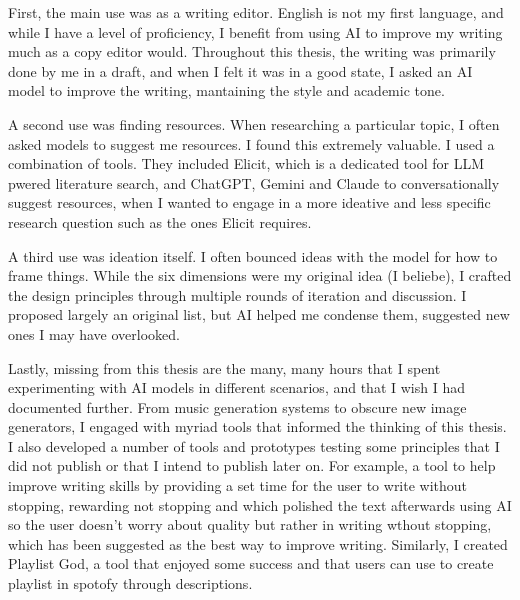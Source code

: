 First, the main use was as a writing editor. English is not my first language, and while I have a level of proficiency, I benefit from using AI to improve my writing much as a copy editor would. Throughout this thesis, the writing was primarily done by me in a draft, and when I felt it was in a good state, I asked an AI model to improve the writing, mantaining the style and academic tone. 

A second use was finding resources. When researching a particular topic, I often asked models to suggest me resources. I found this extremely valuable. I used a combination of tools. They included Elicit, which is a dedicated tool for LLM pwered literature search, and ChatGPT, Gemini and Claude to conversationally suggest resources, when I wanted to engage in a more ideative and less specific research question such as the ones Elicit requires. 

A third use was ideation itself. I often bounced ideas with the model for how to frame things. While the six dimensions were my original idea (I beliebe), I crafted the design principles through multiple rounds of iteration and discussion. I proposed largely an original list, but AI helped me condense them, suggested new ones I may have overlooked. 

Lastly, missing from this thesis are the many, many hours that I spent experimenting with AI models in different scenarios, and that I wish I had documented further. From music generation systems to obscure new image generators, I engaged with myriad tools that informed the thinking of this thesis. I also developed a number of tools and prototypes testing some principles that I did not publish or that I intend to publish later on. For example, a tool to help improve writing skills by providing a set time for the user to write without stopping, rewarding not stopping and which polished the text afterwards using AI so the user doesn't worry about quality but rather in writing wthout stopping, which has been suggested as the best way to improve writing. Similarly, I created Playlist God, a tool that enjoyed some success and that users can use to create playlist in spotofy through descriptions. 

